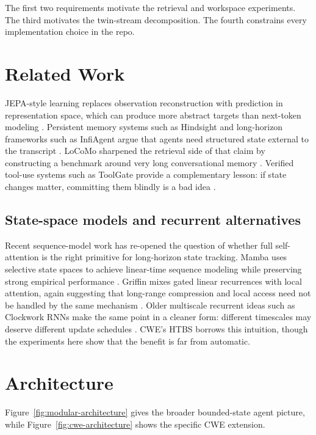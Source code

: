 \documentclass[11pt]{article}
\begin{document}
The first two requirements motivate the retrieval and workspace experiments. The third motivates the twin-stream decomposition. The fourth constrains every implementation choice in the repo.

\section{Related Work}
JEPA-style learning replaces observation reconstruction with prediction in representation space, which can produce more abstract targets than next-token modeling \citep{assran2023jepa, chen2025vljepa, assran2025vjepa2}. Persistent memory systems such as Hindsight and long-horizon frameworks such as InfiAgent argue that agents need structured state external to the transcript \citep{latimer2025hindsight, yu2026infiagent}. LoCoMo sharpened the retrieval side of that claim by constructing a benchmark around very long conversational memory \citep{maharana2024locomo}. Verified tool-use systems such as ToolGate provide a complementary lesson: if state changes matter, committing them blindly is a bad idea \citep{liu2026toolgate}.

\subsection{State-space models and recurrent alternatives}
Recent sequence-model work has re-opened the question of whether full self-attention is the right primitive for long-horizon state tracking. Mamba uses selective state spaces to achieve linear-time sequence modeling while preserving strong empirical performance \citep{gu2023mamba}. Griffin mixes gated linear recurrences with local attention, again suggesting that long-range compression and local access need not be handled by the same mechanism \citep{de2024griffin}. Older multiscale recurrent ideas such as Clockwork RNNs make the same point in a cleaner form: different timescales may deserve different update schedules \citep{koutnik2014clockwork}. CWE's HTBS borrows this intuition, though the experiments here show that the benefit is far from automatic.

\section{Architecture}
Figure~\ref{fig:modular-architecture} gives the broader bounded-state agent picture, while Figure~\ref{fig:cwe-architecture} shows the specific CWE extension.
\end{document}
